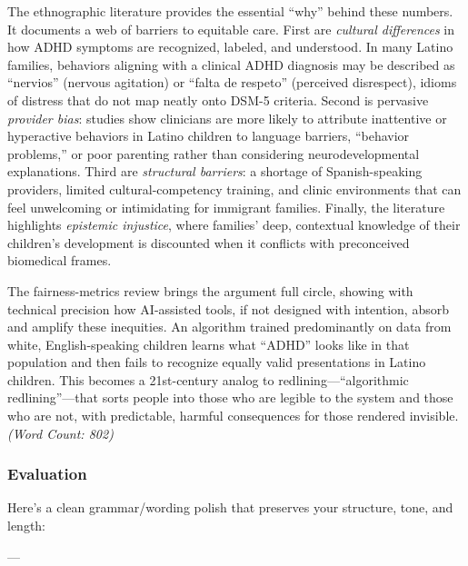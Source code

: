 \documentclass[11pt,twoside]{article}
\begin{document}
The ethnographic literature provides the essential “why” behind these numbers. It documents a web of barriers to equitable care. First are \textit{cultural differences} in how ADHD symptoms are recognized, labeled, and understood. In many Latino families, behaviors aligning with a clinical ADHD diagnosis may be described as “nervios” (nervous agitation) or “falta de respeto” (perceived disrespect), idioms of distress that do not map neatly onto DSM-5 criteria. Second is pervasive \textit{provider bias}: studies show clinicians are more likely to attribute inattentive or hyperactive behaviors in Latino children to language barriers, “behavior problems,” or poor parenting rather than considering neurodevelopmental explanations. Third are \textit{structural barriers}: a shortage of Spanish-speaking providers, limited cultural-competency training, and clinic environments that can feel unwelcoming or intimidating for immigrant families. Finally, the literature highlights \textit{epistemic injustice}, where families’ deep, contextual knowledge of their children’s development is discounted when it conflicts with preconceived biomedical frames.

The fairness-metrics review brings the argument full circle, showing with technical precision how AI-assisted tools, if not designed with intention, absorb and amplify these inequities. An algorithm trained predominantly on data from white, English-speaking children learns what “ADHD” looks like in that population and then fails to recognize equally valid presentations in Latino children. This becomes a 21st-century analog to redlining—“algorithmic redlining”—that sorts people into those who are legible to the system and those who are not, with predictable, harmful consequences for those rendered invisible. \textit{(Word Count: 802)}

\newpage
\vspace{-0.3cm}
\subsubsection*{Evaluation}

\vspace{-0.3cm}
Here’s a clean grammar/wording polish that preserves your structure, tone, and length:

---
\end{document}
